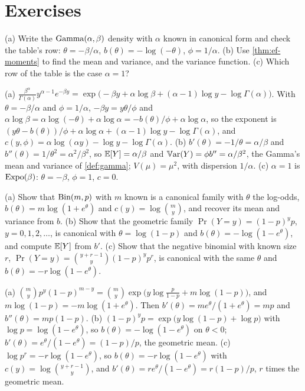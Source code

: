 \section{Exercises}
\label{sec:ef-exercises}

\begin{exercise}
\label{ex:ef-gamma}
(a) Write the $\mathrm{Gamma}(\alpha, \beta)$ density with $\alpha$ known in canonical form and check the table's row: $\theta = -\beta/\alpha$, $b(\theta) = -\log(-\theta)$, $\phi = 1/\alpha$. (b) Use \cref{thm:ef-moments} to find the mean and variance, and the variance function. (c) Which row of the table is the case $\alpha = 1$?
\end{exercise}
\begin{solution}
(a) $\frac{\beta^\alpha}{\Gamma(\alpha)}y^{\alpha-1}e^{-\beta y} = \exp\big(-\beta y + \alpha\log\beta + (\alpha - 1)\log y - \log\Gamma(\alpha)\big)$. With $\theta = -\beta/\alpha$ and $\phi = 1/\alpha$, $-\beta y = y\theta/\phi$ and $\alpha\log\beta = \alpha\log(-\theta) + \alpha\log\alpha = -b(\theta)/\phi + \alpha\log\alpha$, so the exponent is $(y\theta - b(\theta))/\phi + \alpha\log\alpha + (\alpha - 1)\log y - \log\Gamma(\alpha)$, and $c(y, \phi) = \alpha\log(\alpha y) - \log y - \log\Gamma(\alpha)$. (b) $b'(\theta) = -1/\theta = \alpha/\beta$ and $b''(\theta) = 1/\theta^2 = \alpha^2/\beta^2$, so $\operatorname*{\mathbb{E}}[Y] = \alpha/\beta$ and $\operatorname*{\mathbb{V}\text{ar}}(Y) = \phi b'' = \alpha/\beta^2$, the Gamma's mean and variance of \cref{def:gamma}; $V(\mu) = \mu^2$, with dispersion $1/\alpha$. (c) $\alpha = 1$ is $\text{Expo}(\beta)$: $\theta = -\beta$, $\phi = 1$, $c = 0$.
\end{solution}

\begin{exercise}
\label{ex:ef-geometric}
(a) Show that $\mathrm{Bin}(m, p)$ with $m$ known is a canonical family with $\theta$ the log-odds, $b(\theta) = m\log(1 + e^\theta)$ and $c(y) = \log\binom{m}{y}$, and recover its mean and variance from $b$. (b) Show that the geometric family $\Pr(Y = y) = (1 - p)^{y}p$, $y = 0, 1, 2, \ldots$, is canonical with $\theta = \log(1 - p)$ and $b(\theta) = -\log(1 - e^\theta)$, and compute $\operatorname*{\mathbb{E}}[Y]$ from $b'$. (c) Show that the negative binomial with known size $r$, $\Pr(Y = y) = \binom{y + r - 1}{y}(1 - p)^yp^r$, is canonical with the same $\theta$ and $b(\theta) = -r\log(1 - e^\theta)$.
\end{exercise}
\begin{solution}
(a) $\binom{m}{y}p^y(1-p)^{m-y} = \binom{m}{y}\exp\big(y\log\frac{p}{1-p} + m\log(1 - p)\big)$, and $m\log(1 - p) = -m\log(1 + e^\theta)$. Then $b'(\theta) = me^\theta/(1 + e^\theta) = mp$ and $b''(\theta) = mp(1 - p)$. (b) $(1 - p)^yp = \exp\big(y\log(1 - p) + \log p\big)$ with $\log p = \log(1 - e^\theta)$, so $b(\theta) = -\log(1 - e^\theta)$ on $\theta < 0$; $b'(\theta) = e^\theta/(1 - e^\theta) = (1 - p)/p$, the geometric mean. (c) $\log p^r = -r\log(1 - e^\theta)$, so $b(\theta) = -r\log(1 - e^\theta)$ with $c(y) = \log\binom{y + r - 1}{y}$, and $b'(\theta) = re^\theta/(1 - e^\theta) = r(1 - p)/p$, $r$ times the geometric mean.
\end{solution}

